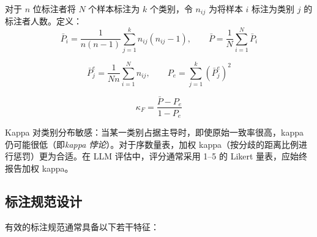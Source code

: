 对于 $n$ 位标注者将 $N$ 个样本标注为 $k$ 个类别，令 $n_{ij}$ 为将样本 $i$ 标注为类别 $j$ 的标注者人数。定义：
\begin{equation}
    \bar{P}_i = \frac{1}{n(n-1)} \sum_{j=1}^{k} n_{ij}(n_{ij} - 1), \qquad \bar{P} = \frac{1}{N}\sum_{i=1}^{N}\bar{P}_i
\end{equation}

\begin{equation}
    \bar{P}_j^e = \frac{1}{Nn}\sum_{i=1}^{N} n_{ij}, \qquad P_e = \sum_{j=1}^{k} \left(\bar{P}_j^e\right)^2
\end{equation}

\begin{equation}
    \kappa_F = \frac{\bar{P} - P_e}{1 - P_e}
\end{equation}

\begin{warningbox}[Kappa 的局限]
Kappa 对类别分布敏感：当某一类别占据主导时，即使原始一致率很高，kappa 仍可能很低（即\emph{kappa 悖论}）。对于序数量表，加权 kappa（按分歧的距离比例进行惩罚）更为合适。在 LLM 评估中，评分通常采用 1--5 的 Likert 量表，应始终报告加权 kappa。
\end{warningbox}

\subsection{标注规范设计}
\label{annotation-guideline-design}

有效的标注规范通常具备以下若干特征：


